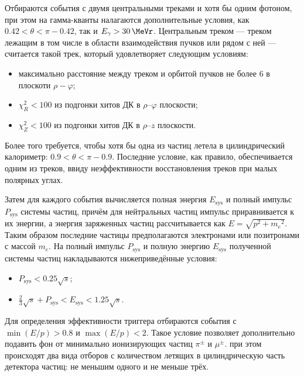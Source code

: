 Отбираются события с двумя центральными треками и хотя бы одним фотоном,
при этом на гамма-кванты налагаются дополнительные условия, 
как $0.42 < \theta < \pi - 0.42$, 
так и $E_\gamma > \SI{30}{\MeVr}$.
Центральным треком
---
треком лежащим в том числе в области взаимодействия пучков или рядом с ней
---
считается такой трек,
который удовлетворяет следующим условиям:
\begin{itemize}
	\item максимально расстояние между треком и орбитой пучков не более \SI{6}{\cmr} в плоскоти $\rho-\varphi$;
	\item $\chi^2_{R} < 100$ из подгонки хитов ДК в $\rho$--$\varphi$ плоскости;
	\item $\chi^2_{Z} < 100$ из подгонки хитов ДК в $\rho$--$z$ плоскости.
\end{itemize}
Более того требуется, чтобы хотя бы одна из частиц летела в цилиндрический калориметр:
$ 0.9 < \theta < \pi - 0.9 $.
Последние условие,
как правило,
обеспечивается одним из треков,
ввиду неэффективности восстановления треков при малых полярных углах.

Затем для каждого события вычисляется полная энергия $E_\text{sys}$ и полный импульс $P_\text{sys}$ системы частиц,
причём для нейтральных частиц импульс приравнивается к их энергии, а энергия заряженных частиц рассчитывается как $E = \sqrt{p^2 + {m_e}^2}$.
Таким образом последние частицы предполагаются электронами или позитронами с массой $m_e$.
На полный импульс $P_\text{sys}$ и полную энергию $E_\text{sys}$ полученной системы частиц накладываются нижеприведённые условия:
\begin{itemize}
    \item $P_\text{sys} < 0.25 \sqrt{s}$;
    \item $\frac{2}{3} \sqrt{s} + P_\text{sys} < E_\text{sys} < 1.25 \sqrt{s}$.
\end{itemize}
Для определения эффективности триггера отбираются события с $\min (E/p) > 0.8$ и $\max (E/p) < 2$.
Такое условие позволяет дополнительно подавить
фон от минимально ионизирующих частиц $\pi^\pm$ и $\mu^\pm$.
при этом происходят два вида отборов с количеством летящих в цилиндрическую часть детектора частиц:
не меньшим одного и не меньше трёх.



